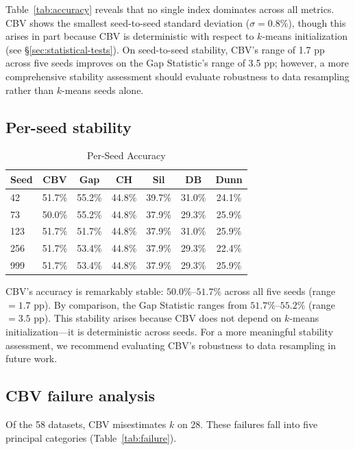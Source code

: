 \documentclass[journal]{IEEEtran}
\begin{document}
Table~\ref{tab:accuracy} reveals that no single index dominates across all metrics. CBV shows the smallest seed-to-seed standard deviation ($\sigma = 0.8\%$), though this arises in part because CBV is deterministic with respect to $k$-means initialization (see \S\ref{sec:statistical-tests}). On seed-to-seed stability, CBV's range of 1.7 pp across five seeds improves on the Gap Statistic's range of 3.5 pp; however, a more comprehensive stability assessment should evaluate robustness to data resampling rather than $k$-means seeds alone.

\subsection{Per-seed stability}
\label{sec:per-seed}

\begin{table}[t]
\centering
\caption{Per-Seed Accuracy}
\label{tab:per-seed}
\small
\begin{tabular}{lcccccc}
\toprule
Seed & CBV & Gap & CH & Sil & DB & Dunn\\
\midrule
42 & 51.7\% & 55.2\% & 44.8\% & 39.7\% & 31.0\% & 24.1\%\\
73 & 50.0\% & 55.2\% & 44.8\% & 37.9\% & 29.3\% & 25.9\%\\
123 & 51.7\% & 51.7\% & 44.8\% & 37.9\% & 31.0\% & 25.9\%\\
256 & 51.7\% & 53.4\% & 44.8\% & 37.9\% & 29.3\% & 22.4\%\\
999 & 51.7\% & 53.4\% & 44.8\% & 37.9\% & 29.3\% & 25.9\%\\
\bottomrule
\end{tabular}
\end{table}

CBV's accuracy is remarkably stable: $50.0\%$--$51.7\%$ across all five seeds (range $= 1.7$ pp). By comparison, the Gap Statistic ranges from $51.7\%$--$55.2\%$ (range $= 3.5$ pp). This stability arises because CBV does not depend on $k$-means initialization---it is deterministic across seeds. For a more meaningful stability assessment, we recommend evaluating CBV's robustness to data resampling in future work.

\subsection{CBV failure analysis}
\label{sec:failure-analysis}

Of the 58 datasets, CBV misestimates $k$ on 28. These failures fall into five principal categories (Table~\ref{tab:failure}).
\end{document}
